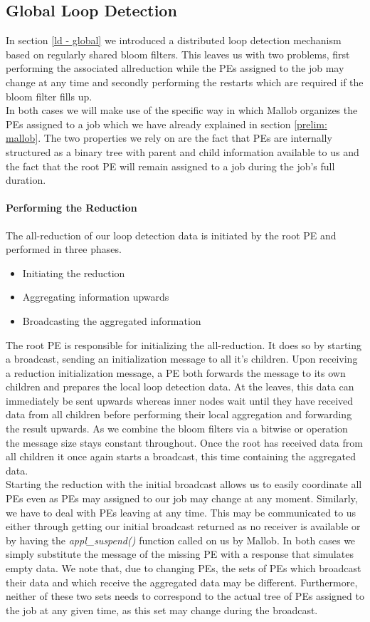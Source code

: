 \subsection{Global Loop Detection}
In section \ref{ld - global} we introduced a distributed loop detection mechanism based on regularly shared bloom filters. This leaves us with two problems, first performing the associated allreduction while the PEs assigned to the job may change at any time and secondly performing the restarts which are required if the bloom filter fills up. \\
In both cases we will make use of the specific way in which Mallob organizes the PEs assigned to a job which we have already explained in section \ref{prelim: mallob}. The two properties we rely on are the fact that PEs are internally structured as a binary tree with parent and child information available to us and the fact that the root PE will remain assigned to a job during the job's full duration.

\paragraph{Performing the Reduction}
The all-reduction of our loop detection data is initiated by the root PE and performed in three phases. 
\begin{itemize}
	\item Initiating the reduction
	\item Aggregating information upwards
	\item Broadcasting the aggregated information
\end{itemize}
The root PE is responsible for initializing the all-reduction. It does so by starting a broadcast, sending an initialization message to all it's children. Upon receiving a reduction initialization message, a PE both forwards the message to its own children and prepares the local loop detection data. At the leaves, this data can immediately be sent upwards whereas inner nodes wait until they have received data from all children before performing their local aggregation and forwarding the result upwards. As we combine the bloom filters via a bitwise or operation the message size stays constant throughout. Once the root has received data from all children it once again starts a broadcast, this time containing the aggregated data. \\
Starting the reduction with the initial broadcast allows us to easily coordinate all PEs even as PEs may assigned to our job may change at any moment. Similarly, we have to deal with PEs leaving at any time. This may be communicated to us either through getting our initial broadcast returned as no receiver is available or by having the \textit{appl\_suspend()} function called on us by Mallob. In both cases we simply substitute the message of the missing PE with a response that simulates empty data. We note that, due to changing PEs, the sets of PEs which broadcast their data and which receive the aggregated data may be different. Furthermore, neither of these two sets needs to correspond to the actual tree of PEs assigned to the job at any given time, as this set may change during the broadcast.

